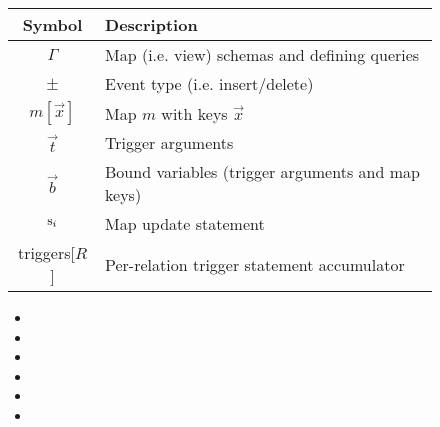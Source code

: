 \begin{figure}
\begin{tabular}{c|l}
Symbol   & Description\\
\hline
$\Gamma$ & Map (i.e. view) schemas and defining queries \\
$\pm$ & Event type (i.e. insert/delete) \\
$m[\vec{x}]$ & Map $m$ with keys $\vec{x}$\\
$\vec{t}$ & Trigger arguments \\
$\vec{b}$ & Bound variables (trigger arguments and map keys)\\
$\mbox{s}_i$ & Map update statement\\ 
triggers[$R$] & Per-relation trigger statement accumulator 
\end{tabular}

\begin{itemize}
\item {} 
\item {}
\item {}
\item {}
\item {}
\item {}
\end{itemize}


\end{figure}
